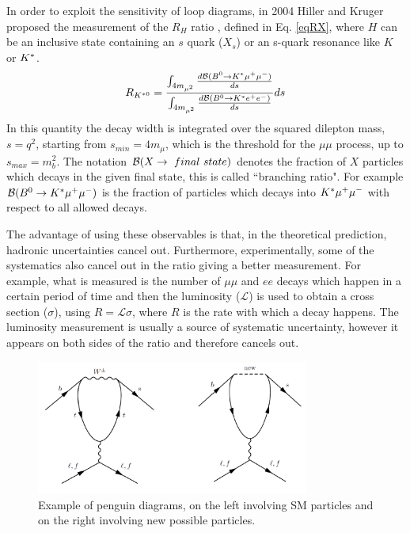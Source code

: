 In order to exploit the sensitivity of loop diagrams, in 2004 Hiller and Kruger proposed the measurement 
of the $R_H$ ratio \cite{Hiller:2003js}, defined in Eq. \ref{eqRX}, where $H$ can be an inclusive state containing 
an $s$ quark ($X_s$) or an s-quark resonance like $K$ or ${{K}^*}$.
\begin{equation}
\label{eqRX}
R_{K^{*0}} = \frac{\int_{4m_{\mu^2}} \frac{ d{\cal B}({{B}^0} \rightarrow {\ensuremath{{K}^*}}{\ensuremath{\mu^+\mu^-}}) }{ds}}{ \int_{4m_{\mu^2}}\frac{ d{\cal B}({{B}^0} \rightarrow {\ensuremath{{K}^*}}e^+ e^-) }{ds}} ds
\end{equation}
In this quantity the decay width is integrated over the squared dilepton mass, $s = q^2$, starting from 
$s_{min} = 4m_{\mu}$, which is the threshold for the $\mu\mu$ process, up to $s_{max} = m_b^2$. 
The notation ${\cal B}(X \rightarrow ~final ~state)$ denotes the fraction of $X$ particles which decays in the 
given final state, this is called ``branching ratio". For example ${\cal B}({{B}^0}\rightarrow{\ensuremath{{K}^*}}{\ensuremath{\mu^+\mu^-}})$ is the
fraction of \Bz particles which decays into ${{K}^*}{\mu^+\mu^-}$ with respect to all allowed \Bz decays.

The advantage of using these observables is that, in the theoretical prediction, hadronic uncertainties 
cancel out. Furthermore, experimentally, some of the systematics also cancel out in the ratio giving a better 
measurement. For example, what is measured is the number of $\mu\mu$ and $ee$ decays which happen in a 
certain period of time and then the luminosity ($\mathcal{L}$) is used to obtain a cross section ($\sigma$), 
using $R = \mathcal{L}\sigma$, where $R$ is the rate with which a decay happens. The luminosity measurement
is usually a source of systematic uncertainty, however it appears on both sides of the ratio
and therefore cancels out.

\begin{figure}[h]
\centering \includegraphics[width=0.8\textwidth]{RKst/figs/penguins.png}
\caption{Example of penguin diagrams, on the left involving SM particles and on the right 
involving new possible particles.}
\label{fig:NPpenguins}
\end{figure}

